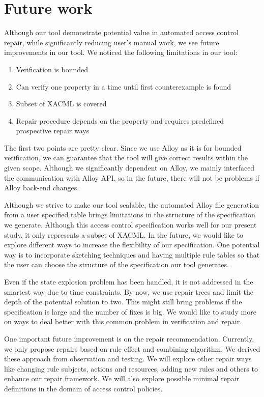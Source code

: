 \documentclass[letterpaper]{acm_proc_article-sp}
\begin{document}
\section{Future work}

Although our tool demonstrate potential value in automated access control repair, while significantly reducing user's manual work, we see future improvements in our tool. We noticed the following limitations in our tool:

\begin{enumerate}
\item Verification is bounded
\item Can verify one property in a time until first counterexample is found
\item Subset of XACML is covered
\item Repair procedure depends on the property and requires predefined prospective repair ways
\end{enumerate}

The first two points are pretty clear. Since we use Alloy as it is for bounded verification, we can guarantee that the tool will give correct results within the given scope. Although we significantly dependent on Alloy, we mainly interfaced the communication with Alloy API, so in the future, there will not be problems if Alloy back-end changes.

Although we strive to make our tool scalable, the automated Alloy file generation from a user specified table brings limitations in the structure of the specification we generate. Although this access control specification works well for our present study, it only represents a subset of XACML. In the future, we would like to explore different ways to increase the flexibility of our specification. One potential way is to incorporate sketching techniques and having multiple rule tables so that the user can choose the structure of the specification our tool generates.

Even if the state explosion problem has been handled, it is not addressed in the smartest way due to time constraints. By now, we use repair trees and limit the depth of the potential solution to two. This might still bring problems if the specification is large and the number of fixes is big. We would like to study more on ways to deal better with this common problem in verification and repair.

One important future improvement is on the repair recommendation. Currently, we only propose repairs based on rule effect and combining algorithm. We derived these approach from observation and testing. We will explore other repair ways like changing rule subjects, actions and resources, adding new rules and others to enhance our repair framework. We will also explore possible minimal repair definitions in the domain of access control policies.
\end{document}
